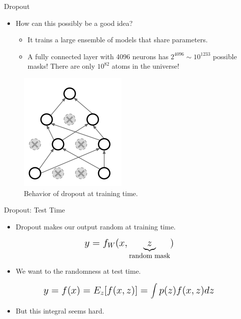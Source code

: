 \begin{frame}{Dropout}
	\begin{itemize}
		\item How can this possibly be a good idea?
		\begin{itemize}
			\item It trains a large ensemble of models that share parameters.
			\medskip
			\item A fully connected layer with 4096 neurons has $2^4096 \sim 10^1233$ possible masks! There are only $10^82$ atoms in the universe!
		\end{itemize}
	\end{itemize}
	\begin{figure}[H]
		\centering
		\includegraphics[height=0.4\textheight]{Figs/section_4/dropout_why2.png}
		\caption{Behavior of dropout at training time. \cite{cs231n-2018-lecture7}}
	\end{figure}
\end{frame}
\begin{frame}{Dropout: Test Time}
	\begin{itemize}
		\item Dropout makes our output random at training time.
		\medskip
	\end{itemize}
	\begin{equation*}
		\mathlarger{\mathlarger{
		y = f_W(x, \underbrace{z}_{\text{random mask}})
	}}
	\end{equation*}
	\begin{itemize}
		\item We want to  the randomness at test time.
		\medskip
	\end{itemize}
	\begin{equation*}
		\mathlarger{\mathlarger{
			y = f(x) = E_z[f(x, z)] = \int p(z)f(x, z) dz
		}}
	\end{equation*}
	\begin{itemize}
		\item But this integral seems hard.
	\end{itemize}
\end{frame}
